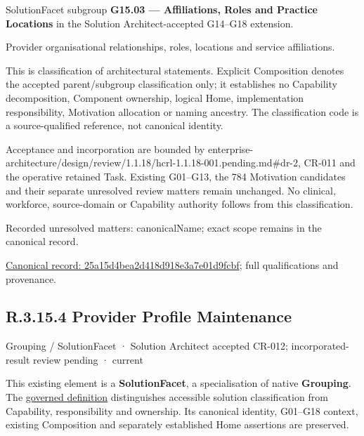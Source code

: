 SolutionFacet subgroup \textbf{G15.03 — Affiliations, Roles and Practice Locations} in the Solution Architect-accepted G14–G18 extension.



Provider organisational relationships, roles, locations and service affiliations.



This is classification of architectural statements. Explicit Composition denotes the accepted parent/subgroup classification only; it establishes no Capability decomposition, Component ownership, logical Home, implementation responsibility, Motivation allocation or naming ancestry. The classification code is a source-qualified reference, not canonical identity.



Acceptance and incorporation are bounded by enterprise-architecture/design/review/1.1.18/hcrl-1.1.18-001.pending.md\#dr-2, CR-011 and the operative retained Task. Existing G01–G13, the 784 Motivation candidates and their separate unresolved review matters remain unchanged. No clinical, workforce, source-domain or Capability authority follows from this classification.


{\small Recorded unresolved matters: canonicalName; exact scope remains in the canonical record.}\par
{\footnotesize \href{../../../../../../../continuum/grouping/25a15d4bea2d418d918e3a7e01d9fcbf.md}{Canonical record: 25a15d4bea2d418d918e3a7e01d9fcbf}; full qualifications and provenance.}\par
\subsection*{R.3.15.4 Provider Profile Maintenance}
\label{navigation:R.3.15.4}

\label{element:a47808600e8f4d7c83756f4ce77b498e}
{\small Grouping / SolutionFacet · Solution Architect accepted CR-012; incorporated-result review pending · current}\par

This existing element is a \textbf{SolutionFacet}, a specialisation of native
\textbf{Grouping}. The \href{\detokenize{../../../../../../../governance/continuum-representation.md#solutionfacet-classification--1119-candidate}}{governed definition}
distinguishes accessible solution classification from Capability, responsibility
and ownership. Its canonical identity, G01–G18 context, existing Composition
and separately established Home assertions are preserved.



